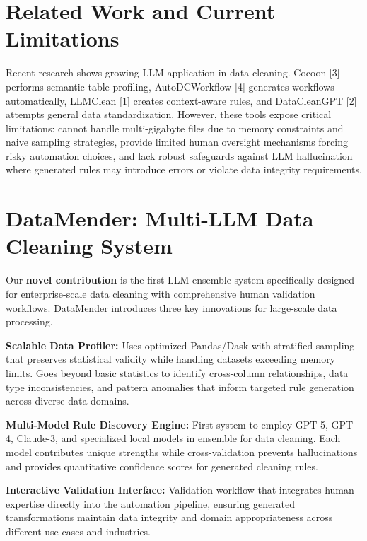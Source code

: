 \documentclass[11pt]{article}
\begin{document}
\section{\color{primaryblue}Related Work and Current Limitations}

Recent research shows growing LLM application in data cleaning. Cocoon [3] performs semantic table profiling, AutoDCWorkflow [4] generates workflows automatically, LLMClean [1] creates context-aware rules, and DataCleanGPT [2] attempts general data standardization. However, these tools expose critical limitations: cannot handle multi-gigabyte files due to memory constraints and naive sampling strategies, provide limited human oversight mechanisms forcing risky automation choices, and lack robust safeguards against LLM hallucination where generated rules may introduce errors or violate data integrity requirements.

\section{\color{primaryblue}DataMender: Multi-LLM Data Cleaning System}

Our \textbf{novel contribution} is the first LLM ensemble system specifically designed for enterprise-scale data cleaning with comprehensive human validation workflows. DataMender introduces three key innovations for large-scale data processing.

\textbf{Scalable Data Profiler:} Uses optimized Pandas/Dask with stratified sampling that preserves statistical validity while handling datasets exceeding memory limits. Goes beyond basic statistics to identify cross-column relationships, data type inconsistencies, and pattern anomalies that inform targeted rule generation across diverse data domains.

\textbf{Multi-Model Rule Discovery Engine:} First system to employ GPT-5, GPT-4, Claude-3, and specialized local models in ensemble for data cleaning. Each model contributes unique strengths while cross-validation prevents hallucinations and provides quantitative confidence scores for generated cleaning rules.

\textbf{Interactive Validation Interface:} Validation workflow that integrates human expertise directly into the automation pipeline, ensuring generated transformations maintain data integrity and domain appropriateness across different use cases and industries.
\end{document}
